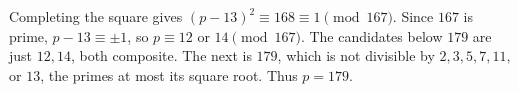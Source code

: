 Completing the square gives $(p-13)^2\equiv168\equiv1\pmod{167}$. Since $167$ is prime, $p-13\equiv\pm1$, so $p\equiv12$ or $14\pmod{167}$. The candidates below $179$ are just $12,14$, both composite. The next is $179$, which is not divisible by $2,3,5,7,11,$ or $13$, the primes at most its square root. Thus $\boxed{p=179}$.
